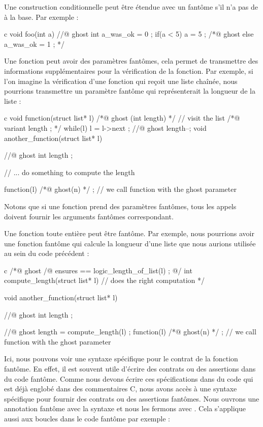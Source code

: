 Une construction conditionnelle  peut être étendue avec un
 fantôme s'il n'a pas de  à la base. Par
exemple :


\begin{CodeBlock}{c}
void foo(int a){
  //@ ghost int a_was_ok = 0 ;
  if(a < 5){
    a = 5 ;
  } /*@ ghost else {
    a_was_ok = 1 ;
  } */
}
\end{CodeBlock}


Une fonction peut avoir des paramètres fantômes, cela permet de transmettre des
informations supplémentaires pour la vérification de la fonction. Par exemple,
si l'on imagine la vérification d'une fonction qui reçoit une liste chaînée,
nous pourrions transmettre un paramètre fantôme qui représenterait la
longueur de la liste :


\begin{CodeBlock}{c}
void function(struct list* l) /*@ ghost (int length) */ {
  // visit the list
  /*@ variant length ; */
  while(l){
    l = l->next ;
    //@ ghost length--;
  }
}
void another_function(struct list* l){
  //@ ghost int length ;

  // ... do something to compute the length

  function(l) /*@ ghost(n) */ ; // we call function with the ghost parameter
}
\end{CodeBlock}


Notons que si une fonction prend des paramètres fantômes, tous les appels doivent
fournir les arguments fantômes correspondant.


Une fonction toute entière peut être fantôme. Par exemple, nous pourrions avoir
une fonction fantôme qui calcule la longueur d'une liste que nous aurions utilisée
au sein du code précédent :

\begin{CodeBlock}{c}
/*@ ghost
  /@ ensures \result == logic_length_of_list(l) ; @/
  int compute_length(struct list* l){
    // does the right computation
  }
*/

void another_function(struct list* l){
  //@ ghost int length ;

  //@ ghost length = compute_length(l) ;
  function(l) /*@ ghost(n) */ ; // we call function with the ghost parameter
}
\end{CodeBlock}


Ici, nous pouvons voir une syntaxe spécifique pour le contrat de la fonction
fantôme. En effet, il est souvent utile d'écrire des contrats ou des assertions
dans du code fantôme. Comme nous devons écrire ces spécifications dans du code
qui est déjà englobé dans des commentaires C, nous avons accès à une syntaxe
spécifique pour fournir des contrats ou des assertions fantômes. Nous ouvrons
une annotation fantôme avec la syntaxe  et nous les fermons avec
. Cela s'applique aussi aux boucles dans le code fantôme par
exemple :


